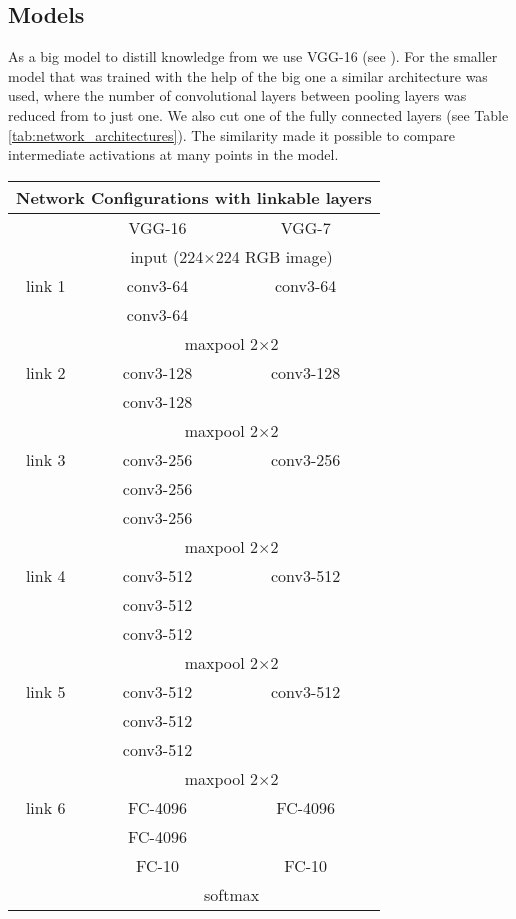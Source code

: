 \documentclass[10pt,twocolumn,letterpaper]{article}
\begin{document}
\subsection{Models}

As a big model to distill knowledge from we use VGG-16 (see \cite{DBLP:journals/corr/SimonyanZ14a}). For the smaller model that was trained with the help of the big one a similar architecture was used, where the number of convolutional layers between pooling layers was reduced from to just one. We also cut one of the fully connected layers (see Table \ref{tab:network_architectures}). The similarity made it possible to compare intermediate activations at many points in the model.

\begin{table}
	\begin{center}
	\begin{tabular}{|c|c|c|}
		\hline
		\multicolumn{3}{|c|}{Network Configurations with linkable layers} \\ \hline
			&	VGG-16	&	VGG-7	\\ \hline
			\hline
		& \multicolumn{2}{c|}{input (224$\times$224 RGB image)} \\ \hline
		link 1	&	conv3-64	&	conv3-64	\\ 
			& 	conv3-64	&		\\ \hline
		
			& \multicolumn{2}{c|}{maxpool 2$\times$2} \\ \hline
		link 2	&	conv3-128	&	conv3-128	\\ 
			& 	conv3-128	&		\\ \hline
			
			& \multicolumn{2}{c|}{maxpool 2$\times$2} \\ \hline
		link 3	&	conv3-256	&	conv3-256	\\ 
			& 	conv3-256	&		\\ 
			& 	conv3-256	&		\\ \hline
			& \multicolumn{2}{c|}{maxpool 2$\times$2} \\ \hline
		link 4	&	conv3-512	&	conv3-512	\\ 
			& 	conv3-512	&		\\ 
			& 	conv3-512	&		\\ \hline
			& \multicolumn{2}{c|}{maxpool 2$\times$2} \\ \hline
		link 5	&	conv3-512	&	conv3-512	\\ 
			& 	conv3-512	&		\\ 
			& 	conv3-512	&		\\ \hline
			& \multicolumn{2}{c|}{maxpool 2$\times$2} \\ \hline
		link 6	&	FC-4096	&	FC-4096	\\ 
			& 	FC-4096	&		\\ 
			& 	FC-10	&	FC-10	\\ \hline
			& \multicolumn{2}{c|}{softmax} \\ \hline
			

\end{tabular}
\end{center}
\end{table}
\end{document}

